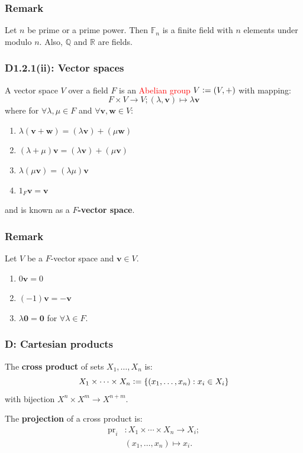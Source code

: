 \documentclass{article}
\newcommand{\deq}{\vcentcolon=}
\newcommand{\vc}[1]{\boldsymbol{#1}}
\begin{document}
\begin{multicols*}{3}
\subsubsection*{Remark}
Let $n$ be prime or a prime power.
Then $\mathbb{F}_n$ is a finite field with $n$ elements
under modulo $n$.
Also, $\mathbb{Q}$ and $\mathbb{R}$ are fields.

\subsubsection*{D1.2.1(ii): Vector spaces}
A vector space $V$ over a field $F$ is an 
\textcolor{red}{Abelian group} $V\deq(V,+)$ with mapping:
$$F\times V\rightarrow V;
(\lambda,\vc{v})\mapsto
\lambda\vc{v}$$
where for $\forall\lambda, \mu\in F$ and
$\forall\vc{v},\vc{w}\in V$:
\begin{enumerate}
    \item
    $\lambda(\vc{v}+\vc{w})
    =(\lambda\vc{v})+(\mu\vc{w})$

    \item $(\lambda+\mu)\vc{v}
    =(\lambda\vc{v})+(\mu\vc{v})$

    \item $\lambda(\mu\vc{v})=(\lambda\mu)\vc{v}$
    
    \item $1_F\vc{v}=\vc{v}$
\end{enumerate}
and is known as a \textbf{$F$-vector space}.

\subsubsection*{Remark}
Let $V$ be a $F$-vector space and $\vc{v}\in V$.
\begin{enumerate}
    \item $0\vc{v}=0$
    \item $(-1)\vc{v}=-\vc{v}$
    \item $\lambda\vc{0}=\vc{0}$
    for $\forall\lambda\in F$.
\end{enumerate}

\subsubsection*{D: Cartesian products}
The \textbf{cross product} of sets $X_1,\dots,X_n$ is:
$$X_1\times\cdots\times X_n
\deq\{(x_1,\dots,x_n):x_i\in X_i\}$$
with bijection $X^n\times X^m\rightarrow X^{n+m}$.

The \textbf{projection} of a cross product is:
\begin{align*}
    \text{pr}_i &:X_1\times\cdots\times X_n
    \rightarrow X_i; \\
    &(x_1,\dots,x_n)\mapsto x_i.
\end{align*}


\end{multicols*}
\end{document}
